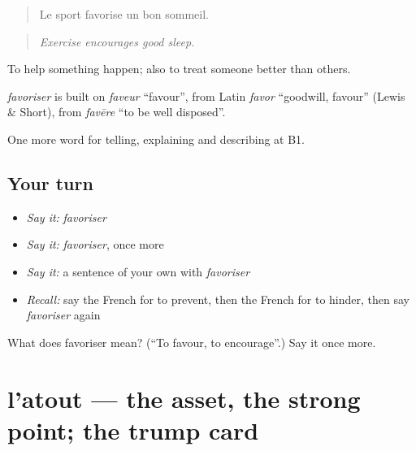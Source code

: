 \begin{quote}
Le sport favorise un bon sommeil.
\end{quote}

\begin{quote}
\emph{Exercise encourages good sleep.}
\end{quote}

To help something happen; also to treat someone better than others.

\begin{cousinweb}
\emph{favoriser} is built on \emph{faveur} \textquotedblleft{}favour\textquotedblright{}, from Latin \emph{favor} \textquotedblleft{}goodwill, favour\textquotedblright{} (Lewis \& Short), from \emph{favēre} \textquotedblleft{}to be well disposed\textquotedblright{}.
\end{cousinweb}

\begin{grammarlens}[title={What you've built}]
One more word for telling, explaining and describing at B1.
\end{grammarlens}

\subsection*{Your turn}
\begin{itemize}
\raggedright
  \item \emph{Say it:} \emph{favoriser}
  \item \emph{Say it:} \emph{favoriser}, once more
  \item \emph{Say it:} a sentence of your own with \emph{favoriser}
  \item \emph{Recall:} say the French for to prevent, then the French for to hinder, then say \emph{favoriser} again
\end{itemize}

\begin{tcolorbox}[breakable,colback=teal!4,colframe=teal!35!black,title={Before you move on}]
What does favoriser mean? (\textquotedblleft{}To favour, to encourage\textquotedblright{}.) Say it once more.
\end{tcolorbox}
\section[l'atout]{l'atout — the asset, the strong point; the trump card}

\label{lesson:FR-C352-atout}



